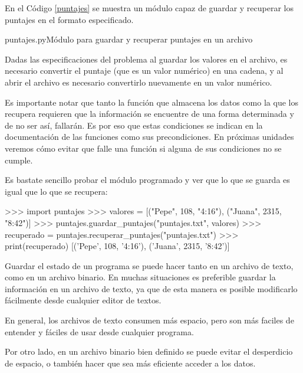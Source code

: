 En el Código \ref{puntajes} se muestra un módulo capaz de guardar y
recuperar los puntajes en el formato especificado.

\begin{codigo}{puntajes.py}{Módulo para guardar y recuperar puntajes en un archivo}
\label{puntajes}

\end{codigo}

Dadas las especificaciones del problema al guardar los valores en el
archivo, es necesario convertir el puntaje (que es un valor numérico) en
una cadena, y al abrir el archivo es necesario convertirlo nuevamente en un
valor numérico.

\begin{observacion}
Es importante notar que tanto la función que almacena los datos como la que
los recupera requieren que la información se encuentre de una forma
determinada y de no ser así, fallarán.  Es por eso que estas condiciones se
indican en la documentación de las funciones como sus precondiciones. En
próximas unidades veremos cómo evitar que falle una función si alguna de
sus condiciones no se cumple.
\end{observacion}

Es bastate sencillo probar el módulo programado y ver que lo que se guarda
es igual que lo que se recupera:

\begin{codigo-python-sn}
>>> import puntajes
>>> valores = [("Pepe", 108, "4:16"), ("Juana", 2315, "8:42")]
>>> puntajes.guardar_puntajes("puntajes.txt", valores)
>>> recuperado = puntajes.recuperar_puntajes("puntajes.txt")
>>> print(recuperado)
[('Pepe', 108, '4:16'), ('Juana', 2315, '8:42')]
\end{codigo-python-sn}


Guardar el estado de un programa se puede hacer tanto en un
archivo de texto, como en un archivo binario. En muchas
situaciones es preferible guardar la información en un archivo de
texto, ya que de esta manera es posible modificarlo fácilmente
desde cualquier editor de textos.

En general, los archivos de texto consumen más
espacio, pero son más faciles de entender y fáciles de usar desde
cualquier programa.

Por otro lado, en un archivo binario bien definido se puede evitar el
desperdicio de espacio, o también hacer que sea más eficiente acceder a los
datos.

